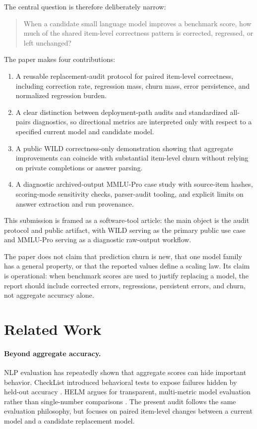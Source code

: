 \documentclass[manuscript, screen, review, nonacm]{jair}
\begin{document}
The central question is therefore deliberately narrow:

\begin{quote}
When a candidate small language model improves a benchmark score, how much of the shared item-level correctness pattern is corrected, regressed, or left unchanged?
\end{quote}

The paper makes four contributions:

\begin{enumerate}
  \item A reusable replacement-audit protocol for paired item-level correctness, including correction rate, regression mass, churn mass, error persistence, and normalized regression burden.
  \item A clear distinction between deployment-path audits and standardized all-pairs diagnostics, so directional metrics are interpreted only with respect to a specified current model and candidate model.
  \item A public WILD correctness-only demonstration showing that aggregate improvements can coincide with substantial item-level churn without relying on private completions or answer parsing.
  \item A diagnostic archived-output MMLU-Pro case study with source-item hashes, scoring-mode sensitivity checks, parser-audit tooling, and explicit limits on answer extraction and run provenance.
\end{enumerate}

This submission is framed as a software-tool article: the main object is the audit protocol and public artifact, with WILD serving as the primary public use case and MMLU-Pro serving as a diagnostic raw-output workflow.

The paper does not claim that prediction churn is new, that one model family has a general property, or that the reported values define a scaling law. Its claim is operational: when benchmark scores are used to justify replacing a model, the report should include corrected errors, regressions, persistent errors, and churn, not aggregate accuracy alone.

\section{Related Work}

\paragraph{Beyond aggregate accuracy.}
NLP evaluation has repeatedly shown that aggregate scores can hide important behavior. CheckList introduced behavioral tests to expose failures hidden by held-out accuracy \parencite{ribeiro2020checklist}. HELM argues for transparent, multi-metric model evaluation rather than single-number comparisons \parencite{liang2022helm}. The present audit follows the same evaluation philosophy, but focuses on paired item-level changes between a current model and a candidate replacement model.
\end{document}
